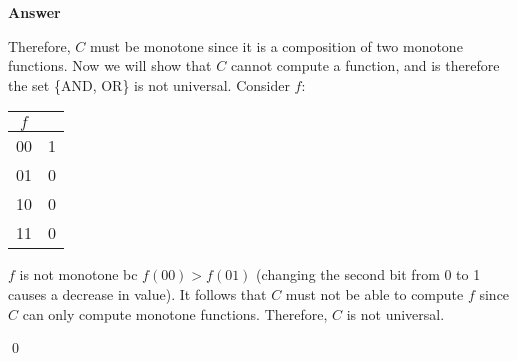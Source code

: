 \documentclass[11pt]{article}
\newcommand \kw[1]{\textbf{#1}}
\newenvironment{answer}{
\vspace{.5cm}
\kw{Answer}
}
{

}
\begin{document}
\begin{enumerate}
\begin{answer}
    Therefore, $C$ must be monotone since it is a composition of two monotone functions. Now we will show that $C$ cannot compute a function, and is therefore the set \{AND, OR\} is not universal. Consider $f$:
    \begin{center}
        \begin{tabular}{ |c|c| }
            $f$ & \\
            \hline
            00 & 1 \\
            01 & 0 \\
            10 & 0 \\
            11 & 0 \\
        \end{tabular}
    \end{center}
    $f$ is not monotone bc $f(00) > f(01)$ (changing the second bit from 0 to 1 causes a decrease in value). It follows that $C$ must not be able to compute $f$ since $C$ can only compute monotone functions. Therefore, $C$ is not universal.

    \qed
\end{answer}

\end{enumerate}
\end{document}
